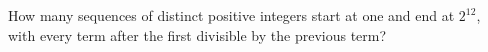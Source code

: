 How many sequences of distinct positive integers start at one and end at $2^{12}$, with every term after the first divisible by the previous term?
